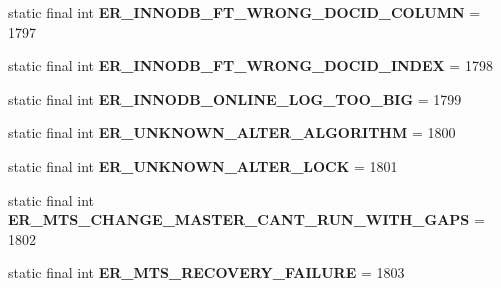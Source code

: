 \begin{DoxyCompactItemize}
static final int {\bfseries E\+R\+\_\+\+I\+N\+N\+O\+D\+B\+\_\+\+F\+T\+\_\+\+W\+R\+O\+N\+G\+\_\+\+D\+O\+C\+I\+D\+\_\+\+C\+O\+L\+U\+MN} = 1797
\item 
\mbox{\label{classcom_1_1mysql_1_1jdbc_1_1_mysql_error_numbers_ac0e69468ac733333e5ebda94dcb3d910}} 
static final int {\bfseries E\+R\+\_\+\+I\+N\+N\+O\+D\+B\+\_\+\+F\+T\+\_\+\+W\+R\+O\+N\+G\+\_\+\+D\+O\+C\+I\+D\+\_\+\+I\+N\+D\+EX} = 1798
\item 
\mbox{\label{classcom_1_1mysql_1_1jdbc_1_1_mysql_error_numbers_a6993d2bdba0b6390e56b73b693496375}} 
static final int {\bfseries E\+R\+\_\+\+I\+N\+N\+O\+D\+B\+\_\+\+O\+N\+L\+I\+N\+E\+\_\+\+L\+O\+G\+\_\+\+T\+O\+O\+\_\+\+B\+IG} = 1799
\item 
\mbox{\label{classcom_1_1mysql_1_1jdbc_1_1_mysql_error_numbers_a0b8fefaadc5c600c3d6ca6561943f4d7}} 
static final int {\bfseries E\+R\+\_\+\+U\+N\+K\+N\+O\+W\+N\+\_\+\+A\+L\+T\+E\+R\+\_\+\+A\+L\+G\+O\+R\+I\+T\+HM} = 1800
\item 
\mbox{\label{classcom_1_1mysql_1_1jdbc_1_1_mysql_error_numbers_a8fe70596fc24796d2f4eb0e55c392631}} 
static final int {\bfseries E\+R\+\_\+\+U\+N\+K\+N\+O\+W\+N\+\_\+\+A\+L\+T\+E\+R\+\_\+\+L\+O\+CK} = 1801
\item 
\mbox{\label{classcom_1_1mysql_1_1jdbc_1_1_mysql_error_numbers_a406aed59d9cd6ce08b0abebe87a5476a}} 
static final int {\bfseries E\+R\+\_\+\+M\+T\+S\+\_\+\+C\+H\+A\+N\+G\+E\+\_\+\+M\+A\+S\+T\+E\+R\+\_\+\+C\+A\+N\+T\+\_\+\+R\+U\+N\+\_\+\+W\+I\+T\+H\+\_\+\+G\+A\+PS} = 1802
\item 
\mbox{\label{classcom_1_1mysql_1_1jdbc_1_1_mysql_error_numbers_ad9c34623a1a2cbd69a78c8851a7e830c}} 
static final int {\bfseries E\+R\+\_\+\+M\+T\+S\+\_\+\+R\+E\+C\+O\+V\+E\+R\+Y\+\_\+\+F\+A\+I\+L\+U\+RE} = 1803
\item 
\mbox{\label{classcom_1_1mysql_1_1jdbc_1_1_mysql_error_numbers_a936317b4851654aa526283d2f968ec66}} 

\end{DoxyCompactItemize}
